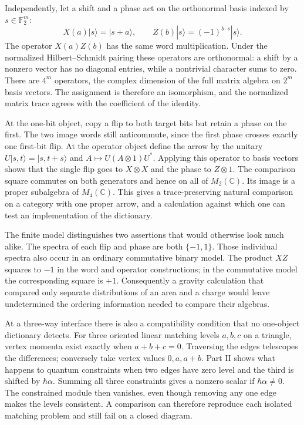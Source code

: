 \documentclass[11pt,letterpaper]{article}
\begin{document}
Independently, let a shift and a phase act on the orthonormal basis indexed by $s\in\mathbb F_2^m$:
\[
 X(a)|s\rangle=|s+a\rangle,\qquad
 Z(b)|s\rangle=(-1)^{b\cdot s}|s\rangle .
\]
The operator $X(a)Z(b)$ has the same word multiplication. Under the normalized Hilbert--Schmidt pairing these operators are orthonormal: a shift by a nonzero vector has no diagonal entries, while a nontrivial character sums to zero. There are $4^m$ operators, the complex dimension of the full matrix algebra on $2^m$ basis vectors. The assignment is therefore an isomorphism, and the normalized matrix trace agrees with the coefficient of the identity.

At the one-bit object, copy a flip to both target bits but retain a phase on the first. The two image words still anticommute, since the first phase crosses exactly one first-bit flip. At the operator object define the arrow by the unitary $U|s,t\rangle=|s,t+s\rangle$ and $A\mapsto U(A\otimes 1)U^*$. Applying this operator to basis vectors shows that the single flip goes to $X\otimes X$ and the phase to $Z\otimes 1$. The comparison square commutes on both generators and hence on all of $M_2(\mathbb C)$. Its image is a proper subalgebra of $M_4(\mathbb C)$. This gives a trace-preserving natural comparison on a category with one proper arrow, and a calculation against which one can test an implementation of the dictionary.

The finite model distinguishes two assertions that would otherwise look much alike. The spectra of each flip and phase are both $\{-1,1\}$. Those individual spectra also occur in an ordinary commutative binary model. The product $XZ$ squares to $-1$ in the word and operator constructions; in the commutative model the corresponding square is $+1$. Consequently a gravity calculation that compared only separate distributions of an area and a charge would leave undetermined the ordering information needed to compare their algebras.

At a three-way interface there is also a compatibility condition that no one-object dictionary detects. For three oriented linear matching levels $a,b,c$ on a triangle, vertex momenta exist exactly when $a+b+c=0$. Traversing the edges telescopes the differences; conversely take vertex values $0,a,a+b$. Part II shows what happens to quantum constraints when two edges have zero level and the third is shifted by $\hbar\alpha$. Summing all three constraints gives a nonzero scalar if $\hbar\alpha\ne0$. The constrained module then vanishes, even though removing any one edge makes the levels consistent. A comparison can therefore reproduce each isolated matching problem and still fail on a closed diagram.
\end{document}
